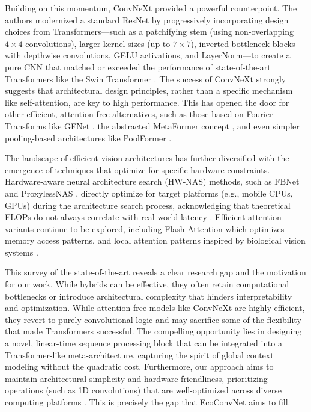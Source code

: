 \documentclass[12pt, a4paper]{article}
\begin{document}
Building on this momentum, ConvNeXt \cite{liu2022convnet} provided a powerful counterpoint. The authors modernized a standard ResNet by progressively incorporating design choices from Transformers---such as a patchifying stem (using non-overlapping $4 \times 4$ convolutions), larger kernel sizes (up to $7 \times 7$), inverted bottleneck blocks with depthwise convolutions, GELU activations, and LayerNorm---to create a pure CNN that matched or exceeded the performance of state-of-the-art Transformers like the Swin Transformer \cite{liu2021swin}. The success of ConvNeXt strongly suggests that architectural design principles, rather than a specific mechanism like self-attention, are key to high performance. This has opened the door for other efficient, attention-free alternatives, such as those based on Fourier Transforms like GFNet \cite{rao2021global}, the abstracted MetaFormer concept \cite{yu2022metaformer}, and even simpler pooling-based architectures like PoolFormer \cite{yu2022metaformer}.

The landscape of efficient vision architectures has further diversified with the emergence of techniques that optimize for specific hardware constraints. Hardware-aware neural architecture search (HW-NAS) methods, such as FBNet \cite{wu2019fbnet} and ProxylessNAS \cite{cai2019proxylessnas}, directly optimize for target platforms (e.g., mobile CPUs, GPUs) during the architecture search process, acknowledging that theoretical FLOPs do not always correlate with real-world latency \cite{yu2020bignas}. Efficient attention variants continue to be explored, including Flash Attention \cite{dao2022flashattention} which optimizes memory access patterns, and local attention patterns inspired by biological vision systems \cite{hassani2023neighborhood}.

This survey of the state-of-the-art reveals a clear research gap and the motivation for our work. While hybrids can be effective, they often retain computational bottlenecks or introduce architectural complexity that hinders interpretability and optimization. While attention-free models like ConvNeXt are highly efficient, they revert to purely convolutional logic and may sacrifice some of the flexibility that made Transformers successful. The compelling opportunity lies in designing a novel, linear-time sequence processing block that can be integrated into a Transformer-like meta-architecture, capturing the spirit of global context modeling without the quadratic cost. Furthermore, our approach aims to maintain architectural simplicity and hardware-friendliness, prioritizing operations (such as 1D convolutions) that are well-optimized across diverse computing platforms \cite{sze2017efficient}. This is precisely the gap that EcoConvNet aims to fill.
\end{document}
